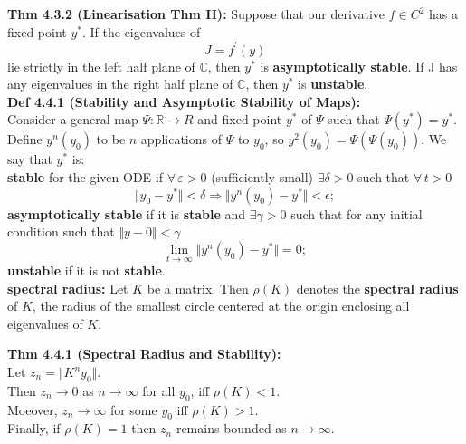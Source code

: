\documentclass[10pt,a4paper]{article}
\newcommand{\R}{\mathbb{R}}
\newcommand{\C}{\mathbb{C}}
\renewcommand{\implies}{\Rightarrow}
\begin{document}
\begin{multicols*}{2}
\textbf{Thm 4.3.2 (Linearisation Thm II):} Suppose that our derivative $f \in C^2$ has a fixed point $y^*$. If the eigenvalues of 
\[
J = f^\prime(y)    
\]
lie strictly in the left half plane of $\C$, then $y^*$ is \textbf{asymptotically stable}. If J has any eigenvalues in the right half plane of $\C$, then $y^*$ is \textbf{unstable}.\\

\textbf{Def 4.4.1 (Stability and Asymptotic Stability of Maps):}\\
Consider a general map $\Psi : \R \to R$ and fixed point $y^*$ of $\Psi$ such that $\Psi(y^*) = y^*$. Define $y^n(y_0)$ to be $n$ applications of $\Psi$ to $y_0$, so $y^2(y_0) = \Psi(\Psi(y_0))$. We say that $y^*$ is:\\
\textbf{stable} for the given ODE if $\forall \, \varepsilon > 0$ (sufficiently small) $\exists \delta > 0$ such that $\forall \, t > 0$
\[
    \Vert y_0 - y^*\Vert  < \delta \implies \Vert y^n(y_0) - y^* \Vert < \epsilon;
\]
\textbf{asymptotically stable} if it is \textbf{stable} and $\exists \gamma > 0 $ such that for any initial condition such that $\Vert y-0 \Vert < \gamma$ 
\[
    \lim_{t \to \infty} \Vert y^n(y_0) - y^* \Vert = 0;
\]
\textbf{unstable} if it is not \textbf{stable}.\\

\textbf{spectral radius:} Let $K$ be a matrix. Then $\rho(K)$ denotes the \textbf{spectral radius} of $K$, the radius of the smallest circle centered at the origin enclosing all eigenvalues of $K$.

\textbf{Thm 4.4.1 (Spectral Radius and Stability):}\\
Let $z_n = \Vert K^ny_0 \Vert$.\\
Then $z_n \to 0$ as $n \to \infty$ for all $y_0$, iff $\rho(K) < 1$.\\
Moeover, $z_n \to \infty$ for some $y_0$ iff $\rho(K) > 1$.\\
Finally, if $\rho(K) = 1$ then $z_n$ remains bounded as $n \to \infty$.\\


\end{multicols*}
\end{document}
